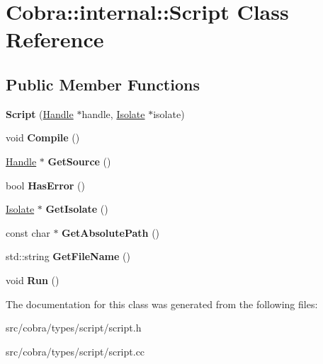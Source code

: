 \hypertarget{class_cobra_1_1internal_1_1_script}{\section{Cobra\+:\+:internal\+:\+:Script Class Reference}
\label{class_cobra_1_1internal_1_1_script}
}
\subsection*{Public Member Functions}
\begin{DoxyCompactItemize}
\item 
\hypertarget{class_cobra_1_1internal_1_1_script_ab0dfb9a0a4882dd1300a4095fff753b6}{{\bfseries Script} (\hyperlink{class_cobra_1_1internal_1_1_handle}{Handle} $\ast$handle, \hyperlink{class_cobra_1_1internal_1_1_isolate}{Isolate} $\ast$isolate)}\label{class_cobra_1_1internal_1_1_script_ab0dfb9a0a4882dd1300a4095fff753b6}

\item 
\hypertarget{class_cobra_1_1internal_1_1_script_a4bf8df38004b8c9e499b42d2f1141754}{void {\bfseries Compile} ()}\label{class_cobra_1_1internal_1_1_script_a4bf8df38004b8c9e499b42d2f1141754}

\item 
\hypertarget{class_cobra_1_1internal_1_1_script_af7e4c059682b56d466083f5ee2b0435d}{\hyperlink{class_cobra_1_1internal_1_1_handle}{Handle} $\ast$ {\bfseries Get\+Source} ()}\label{class_cobra_1_1internal_1_1_script_af7e4c059682b56d466083f5ee2b0435d}

\item 
\hypertarget{class_cobra_1_1internal_1_1_script_a6280b18bbd397e78a6434fa32d82f004}{bool {\bfseries Has\+Error} ()}\label{class_cobra_1_1internal_1_1_script_a6280b18bbd397e78a6434fa32d82f004}

\item 
\hypertarget{class_cobra_1_1internal_1_1_script_ab9b6b9a9a8ef1dd7fdd697281d3b6e52}{\hyperlink{class_cobra_1_1internal_1_1_isolate}{Isolate} $\ast$ {\bfseries Get\+Isolate} ()}\label{class_cobra_1_1internal_1_1_script_ab9b6b9a9a8ef1dd7fdd697281d3b6e52}

\item 
\hypertarget{class_cobra_1_1internal_1_1_script_aa5518a367d696148e28218e204bc27fb}{const char $\ast$ {\bfseries Get\+Absolute\+Path} ()}\label{class_cobra_1_1internal_1_1_script_aa5518a367d696148e28218e204bc27fb}

\item 
\hypertarget{class_cobra_1_1internal_1_1_script_a7597bd8421590bcbe0d6e585630df934}{std\+::string {\bfseries Get\+File\+Name} ()}\label{class_cobra_1_1internal_1_1_script_a7597bd8421590bcbe0d6e585630df934}

\item 
\hypertarget{class_cobra_1_1internal_1_1_script_a317a0a111e63fd90cc64c46fbcf32c88}{void {\bfseries Run} ()}\label{class_cobra_1_1internal_1_1_script_a317a0a111e63fd90cc64c46fbcf32c88}

\end{DoxyCompactItemize}


The documentation for this class was generated from the following files\+:\begin{DoxyCompactItemize}
\item 
src/cobra/types/script/script.\+h\item 
src/cobra/types/script/script.\+cc\end{DoxyCompactItemize}

